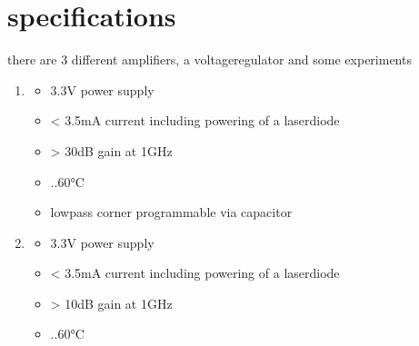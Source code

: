 \documentclass[letterpaper,10pt,english]{sphinxmanual}
\begin{document}
\chapter{specifications}
\label{\detokenize{specification:specifications}}\label{\detokenize{specification::doc}}
\sphinxAtStartPar
there are 3 different amplifiers, a voltage\sphinxhyphen{}regulator and some experiments
\begin{enumerate}
%
\item {} \begin{description}
\begin{itemize}
\item {} 
\sphinxAtStartPar
3.3V power supply

\item {} 
\sphinxAtStartPar
\textless{} 3.5mA current including powering of a laser\sphinxhyphen{}diode

\item {} 
\sphinxAtStartPar
\textgreater{} 30dB gain at 1GHz

\item {} 
..60°C

\item {} 
\sphinxAtStartPar
low\sphinxhyphen{}pass corner programmable via capacitor

\end{itemize}

\end{description}

\item {} \begin{description}
\begin{itemize}
\item {} 
\sphinxAtStartPar
3.3V power supply

\item {} 
\sphinxAtStartPar
\textless{} 3.5mA current including powering of a laser\sphinxhyphen{}diode

\item {} 
\sphinxAtStartPar
\textgreater{} 10dB gain at 1GHz

\item {} 
..60°C

\end{itemize}

\end{description}


\end{enumerate}
\end{document}
